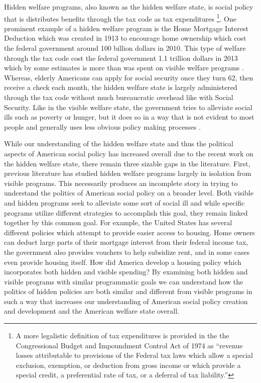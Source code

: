 \documentclass[12pt]{article}
\begin{document}
Hidden welfare programs, also known as the hidden welfare state, is social policy that is distributes benefits through the tax code as tax expenditures \citep{howard1997}\footnote{A more legalistic definition of tax expenditures is provided in the the Congressional Budget and Impoundment Control Act of 1974 as ``revenue losses attributable to provisions of the Federal tax laws which allow a special exclusion, exemption, or deduction from gross income or which provide a special credit, a preferential rate of tax, or a deferral of tax liability.''}. One prominent example of a hidden welfare program is the Home Mortgage Interest Deduction which was created in 1913 to encourage home ownership which cost the federal government around 100 billion dollars in 2010. This type of welfare through the tax code cost the federal government 1.1 trillion dollars in 2013 which by some estimates is more than was spent on visible welfare programs \citep{omb2013}. Whereas, elderly Americans can apply for social security once they turn 62, then receive a check each month, the hidden welfare state is largely administered through the tax code without much bureaucratic overhead like with Social Security. Like in the visible welfare state, the government tries to alleviate social ills such as poverty or hunger, but it does so in a way that is not evident to most people and generally uses less obvious policy making processes \citep{mettler2011}. 

While our understanding of the hidden welfare state and thus the political aspects of American social policy has increased overall due to the recent work on the hidden welfare state, there remain three sizable gaps in the literature. First, previous literature has studied hidden welfare programs largely in isolation from visible programs. This necessarily produces an incomplete story in trying to understand the politics of American social policy on a broader level. Both visible and hidden programs seek to alleviate some sort of social ill and while specific programs utilize different strategies to accomplish this goal, they remain linked together by this common goal. For example, the United States has several different policies which attempt to provide easier access to housing. Home owners can deduct large parts of their mortgage interest from their federal income tax, the government also provides vouchers to help subsidize rent, and in some cases even provide housing itself. How did America develop a housing policy which incorporates both hidden and visible spending? By examining both hidden and visible programs with similar programmatic goals we can understand how the politics of hidden policies are both similar and different from visible programs in such a way that increases our understanding of American social policy creation and development and the American welfare state overall.
\end{document}
